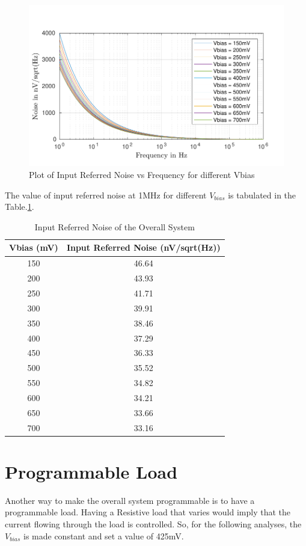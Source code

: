 \begin{figure} [H]
\centering
\includegraphics[scale=1]{Figures/Plots/Ov_Noise.pdf}
\caption{Plot of Input Referred Noise vs Frequency for different Vbias}
\label{fig:NOISE}
\end{figure}

The value of input referred noise at 1MHz for different $V_{bias}$ is tabulated in the Table.\ref{tab:NOISE}.

\begin{table} [H]
\centering
\begin{tabular}{@{}cc@{}}
\toprule
Vbias (mV)			& Input Referred Noise (nV/sqrt(Hz))	\\ \midrule
150					& 46.64 \\
200					& 43.93 \\
250					& 41.71 \\
300					& 39.91 \\
350					& 38.46 \\
400					& 37.29 \\
450					& 36.33 \\
500					& 35.52 \\
550					& 34.82 \\
600					& 34.21 \\
650					& 33.66 \\
700 				& 33.16 \\
\bottomrule
\end{tabular}
\caption{Input Referred Noise of the Overall System}
\label{tab:NOISE}
\end{table}


\section{Programmable Load}
Another way to make the overall system programmable is to have a programmable load. Having a Resistive load that varies would imply that the current flowing through the load is controlled. So, for the following analyses, the $V_{bias}$ is made constant and set a value of 425mV.

